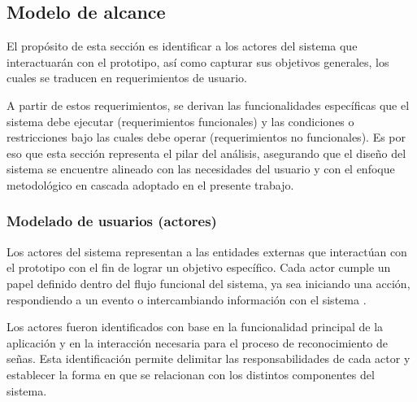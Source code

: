 	\subsection{Modelo de alcance}
	
	El propósito de esta sección es identificar a los actores del sistema que interactuarán con el prototipo, así como capturar sus objetivos generales, los cuales se traducen en requerimientos de usuario.
	
	A partir de estos requerimientos, se derivan las funcionalidades específicas que el sistema debe ejecutar (requerimientos funcionales) y las condiciones o restricciones bajo las cuales debe operar (requerimientos no funcionales). Es por eso que esta sección representa el pilar del análisis, asegurando que el diseño del sistema se encuentre alineado con las necesidades del usuario y con el enfoque metodológico en cascada adoptado en el presente trabajo.
	
	
	
	\subsubsection{Modelado de usuarios (actores)}
	
	Los actores del sistema representan a las entidades externas que interactúan con el prototipo con el fin de lograr un objetivo específico. Cada actor cumple un papel definido dentro del flujo funcional del sistema, ya sea iniciando una acción, respondiendo a un evento o intercambiando información con el sistema \cite{dennis2012}.
	
	Los actores fueron identificados con base en la funcionalidad principal de la aplicación y en la interacción necesaria para el proceso de reconocimiento de señas. Esta identificación permite delimitar las responsabilidades de cada actor y establecer la forma en que se relacionan con los distintos componentes del sistema.
	
